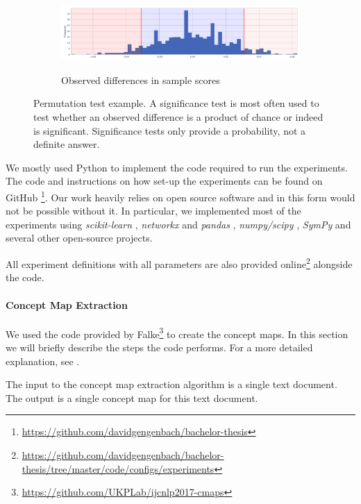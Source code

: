 \begin{figure}[htb!]
  \begin{subfigure}[t]{\linewidth}
  {\includegraphics[width=1\textwidth]{assets/figures/permutation_test/distribution.pdf}\label{fig:permutation_test_distribution}}
  \caption{Observed differences in sample scores}
  \end{subfigure}
  \caption[Example: Permutation Test]{Permutation test example. A significance test is most often used to test whether an observed difference is a product of chance or indeed is significant. Significance tests only provide a probability, not a definite answer.}
  \label{fig:example_permutation_test}
\end{figure}


We mostly used Python to implement the code required to run the experiments.
The code and instructions on how set-up the experiments can be found on GitHub \footnote{\url{https://github.com/davidgengenbach/bachelor-thesis}}.
Our work heavily relies on open source software and in this form would not be possible without it.
In particular, we implemented most of the experiments using \textit{scikit-learn} \cite{Pedregosa2012}, \textit{networkx} \cite{Hagberg2008} and \textit{pandas} \cite{McKinney2010}, \textit{numpy/scipy} \cite{VanderWalt2011}, \textit{SymPy} \cite{Meurer2017} and several other open-source projects.

All experiment definitions with all parameters are also provided online\footnote{\url{https://github.com/davidgengenbach/bachelor-thesis/tree/master/code/configs/experiments}} alongside the code.

\paragraph{Concept Map Extraction}
We used the code provided by Falke\footnote{\url{https://github.com/UKPLab/ijcnlp2017-cmaps}}  to create the concept maps.
In this section we will briefly describe the steps the code performs. For a more detailed explanation, see \cite{Falke2017}.

The input to the concept map extraction algorithm is a single text document. The output is a single concept map for this text document.

